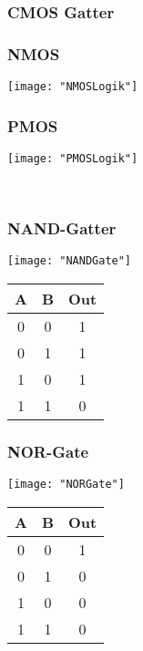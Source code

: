 \subsubsection{CMOS Gatter}
\begin{minipage}[t]{0.45\textwidth}
	\vspace{0pt}								%
	\subsubsection{NMOS}
	\texttt{[image: "NMOSLogik"]}
\end{minipage}\hspace{0.05\textwidth}
\begin{minipage}[t]{0.45\textwidth}
	\vspace{0pt}								%
	\subsubsection{PMOS}
	\texttt{[image: "PMOSLogik"]}
\end{minipage}\\
\begin{minipage}[t]{0.45\textwidth}
	\vspace{0pt}								%
	\subsubsection{NAND-Gatter}
	\texttt{[image: "NANDGate"]}
	\begin{tabular}{|c|c|c|}
		\hline
		A & B & Out \\
		\hline
		0 & 0 & 1 \\
		\hline
		0 & 1 & 1 \\
		\hline
		1 & 0 & 1 \\
		\hline
		1 & 1 & 0 \\
		\hline
	\end{tabular}
\end{minipage}\hspace{0.05\textwidth}
\begin{minipage}[t]{0.45\textwidth}
	\vspace{0pt}								%
	\subsubsection{NOR-Gate}
	\texttt{[image: "NORGate"]}
	\begin{tabular}{|c|c|c|}
		\hline
		A & B & Out \\
		\hline
		0 & 0 & 1 \\
		\hline
		0 & 1 & 0 \\
		\hline
		1 & 0 & 0 \\
		\hline
		1 & 1 & 0 \\
		\hline
	\end{tabular}
\end{minipage}
\vspace{2mm}

